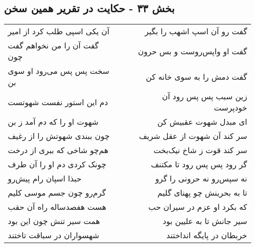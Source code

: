 \begin{center}
\section*{بخش ۳۳ - حکایت در تقریر همین سخن}
\label{sec:sh033}
\begin{longtable}{l p{0.5cm} r}
آن یکی اسپی طلب کرد از امیر
&&
گفت رو آن اسپ اشهب را بگیر
\\
گفت آن را من نخواهم گفت چون
&&
گفت او واپس‌روست و بس حرون
\\
سخت پس پس می‌رود او سوی بن
&&
گفت دمش را به سوی خانه کن
\\
دم این استور نفست شهوتست
&&
زین سبب پس پس رود آن خودپرست
\\
شهوت او را که دم آمد ز بن
&&
ای مبدل شهوت عقبیش کن
\\
چون ببندی شهوتش را از رغیف
&&
سر کند آن شهوت از عقل شریف
\\
هم‌چو شاخی که ببری از درخت
&&
سر کند قوت ز شاخ نیک‌بخت
\\
چونک کردی دم او را آن طرف
&&
گر رود پس پس رود تا مکتنف
\\
حبذا اسپان رام پیش‌رو
&&
نه سپس‌رو نه حرونی را گرو
\\
گرم‌رو چون جسم موسی کلیم
&&
تا به بحرینش چو پهنای گلیم
\\
هست هفصدساله راه آن حقب
&&
که بکرد او عزم در سیران حب
\\
همت سیر تنش چون این بود
&&
سیر جانش تا به علیین بود
\\
شهسواران در سباقت تاختند
&&
خربطان در پایگه انداختند
\\
\end{longtable}
\end{center}
